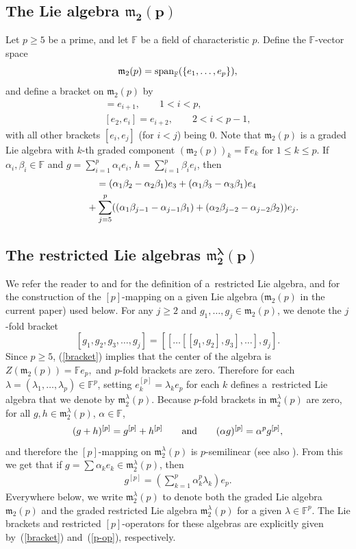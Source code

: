 \documentclass[10pt,a4paper]{amsart}
\def\spn{\mathop{\rm span}}
\def\m{\mathfrak m}
\def\F{\mathbb F}
\numberwithin{equation}{section}
\begin{document}
\subsection[The Lie algebra $\m_2(p)$]{The Lie algebra $\boldsymbol{\m_2(p)}$}\label{section2.1}

Let $p\ge 5$ be a prime, and let $\F$ be a field of characteristic
$p$. Define the $\F$-vector space
\[\m_2(p)=\spn\nolimits_\F(\{e_1,\dots , e_p\}), \]
and define a bracket on $\m_2(p)$ by \
\begin{gather*}
 [e_1,e_i] =e_{i+1},\qquad 1<i < p,\\
 [e_2,e_i] =e_{i+2},\qquad 2<i < p-1,
\end{gather*}
with all other brackets $[e_i,e_j]$ (for $i<j$) being $0$. Note that
$\m_2(p)$ is a graded Lie algebra with $k$-th graded component
$(\m_2(p))_k=\F e_k$ for $1\le k\le p$. If $\alpha_i, \beta_i \in \F$
and $g=\sum_{i=1}^p \alpha_ie_i$, $h=\sum_{i=1}^p \beta_ie_i$, then
\begin{gather} [g,h] =(\alpha_1\beta_2-\alpha_2\beta_1)e_3+(\alpha_1\beta_3-\alpha_3\beta_1)e_4 \nonumber\\
\hphantom{[g,h] =}{} +\sum_{j=5}^p ((\alpha_1\beta_{j-1}-\alpha_{j-1}\beta_1)+(\alpha_2\beta_{j-2}-\alpha_{j-2}\beta_2)) e_j.\label{bracket}
\end{gather}

\subsection[The restricted Lie algebras $\m_2^\lambda(p)$]{The restricted Lie algebras $\boldsymbol{\m_2^\lambda(p)}$}

We refer the reader to \cite[Chapter~V, Section~7]{JacobsonBook} and \cite[Section~2.2]{SF} for the definition of a~restricted Lie algebra,
and for the construction of the $[p]$-mapping on a given Lie algebra
($\m_2(p)$ in the current paper) used below. For any $j\ge 2$ and
$g_1,\dots, g_j\in\m_2(p)$, we denote the $j$-fold bracket
\[[g_1,g_2,g_3,\dots, g_j]=[[\dots[[g_1,g_2],g_3],\dots],g_j].\] Since
$p\ge 5$, (\ref{bracket}) implies that the center of the algebra is
$Z(\m_2(p))= \F e_p,$ and $p$-fold brackets are zero. Therefore for
each $\lambda=(\lambda_1, \dots , \lambda_p)\in\F^p$, setting
$e_k^{[p]}=\lambda_k e_p$ for each $k$ defines a~restricted Lie
algebra that we denote by $\m_2^\lambda(p)$. Because $p$-fold
brackets in $\m_2^\lambda(p)$ are zero, for all
$g,h\in\m_2^\lambda(p)$, $\alpha\in\F$,
\[(g+h)^{[p]}=g^{[p]}+h^{[p]}\qquad {\rm and}\qquad (\alpha g)^{[p]}=\alpha^p g^{[p]},\] and therefore the $[p]$-mapping on
$\m_2^\lambda(p)$ is $p$-semilinear (see also \cite[Chapter~2, Lemma~1.2]{SF}). From this we get that if
$g=\sum \alpha_k e_k\in\m_2^\lambda(p)$, then
\begin{eqnarray}\label{p-op} g^{[p]}=\left (\sum_{k=1}^p \alpha_k^p\lambda_k \right ) e_p.
\end{eqnarray}
Everywhere below, we write $\m_2^\lambda(p)$ to denote both the graded
Lie algebra $\m_2(p)$ and the graded restricted Lie algebra
$\m_2^\lambda(p)$ for a given $\lambda\in\F^p$. The Lie brackets and
restricted $[p]$-operators for these algebras are explicitly given by~(\ref{bracket}) and~(\ref{p-op}), respectively.
\end{document}
